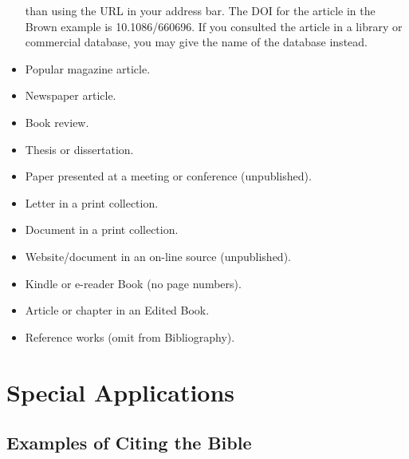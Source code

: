 \documentclass[raggedright]{turabian-researchpaper}
\begin{document}
\begin{itemize}
{  than using the URL in your address bar. The DOI for the article in the Brown
  example is 10.1086/660696. If you consulted the article in a library or
  commercial database, you may give the name of the database instead.}
\item Popular magazine article.\autocite[84]{Turabian}
\item Newspaper article.\autocite[B 12]{Turabian}
\item Book review.\autocite[16]{Turabian}
\item Thesis or dissertation.\autocite[22--29, 35]{Turabian}
\item Paper presented at a meeting or conference
  (unpublished).\autocite{Turabian}
\item Letter in a print collection.\autocite[199-200]{Turabian}
\item Document in a print collection.\autocite[19-23]{Turabian}
\item Website/document in an on-line source (unpublished).\autocite{Turabian}
\item Kindle or e-reader Book (no page numbers).\autocite[loc. 103,
  Kindle]{Turabian}
\item Article or chapter in an Edited Book.\autocite[68]{Turabian}
\item Reference works (omit from Bibliography).\autocite{Turabian}
\end{itemize}

\section{Special Applications}

\subsection{Examples of Citing the Bible}
\end{document}
